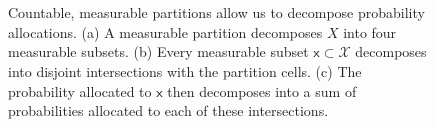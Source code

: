 \documentclass[
  letterpaper,
  DIV=11,
  numbers=noendperiod]{scrartcl}
\begin{document}
\begin{figure}
\begin{minipage}{0.50\linewidth}
{}

\subcaption{\label{fig-total-probability-subset-decomposition}}

\end{minipage}%
\newline
\begin{minipage}{0.25\linewidth}
~\end{minipage}%
%
\begin{minipage}{0.50\linewidth}


\subcaption{\label{fig-total-probability-probability-decomposition}}

\end{minipage}%
%
\begin{minipage}{0.25\linewidth}
~\end{minipage}%

\caption{\label{fig-total-probabilitity}Countable, measurable partitions
allow us to decompose probability allocations. (a) A measurable
partition decomposes \(X\) into four measurable subsets. (b) Every
measurable subset \(\mathsf{x} \subset \mathcal{X}\) decomposes into
disjoint intersections with the partition cells. (c) The probability
allocated to \(\mathsf{x}\) then decomposes into a sum of probabilities
allocated to each of these intersections.}

\end{figure}%
\end{document}
